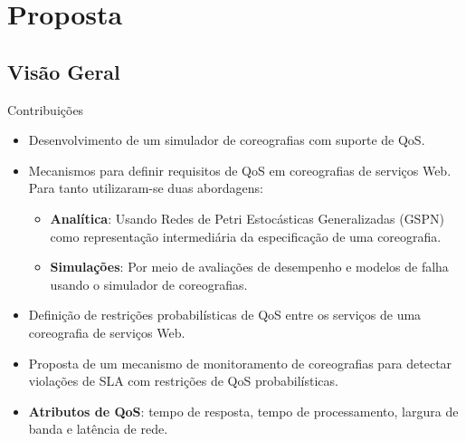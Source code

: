 \documentclass[xcolor=svgnames]{beamer}
\begin{document}
\section{Proposta}

\subsection{Visão Geral}
   \begin{frame}{Contribuições}

      \begin{itemize}
	  \item <1->  Desenvolvimento de um simulador de coreografias com suporte de QoS.
          \item <2-> Mecanismos para definir requisitos de QoS em coreografias de serviços Web. Para tanto utilizaram-se duas abordagens:
             \begin{itemize}
                  \item \textbf{Analítica}:  Usando Redes de Petri Estocásticas Generalizadas (GSPN) como representação intermediária
		    da especificação de uma coreografia.
                  \item \textbf{Simulações}: Por meio de avaliações de desempenho e modelos de falha usando o simulador de coreografias.
            \end{itemize}

         \item <3-> Definição de restrições  probabilísticas de QoS entre os serviços de uma  coreografia de serviços Web.
	 \item <4-> Proposta de um mecanismo de monitoramento de coreografias para detectar violações de SLA com restrições de QoS probabilísticas.
	 \item <5->\textbf{Atributos de QoS}: tempo de resposta, tempo de processamento, largura de banda e latência de rede.
       \end{itemize}


   \end{frame}
\end{document}
